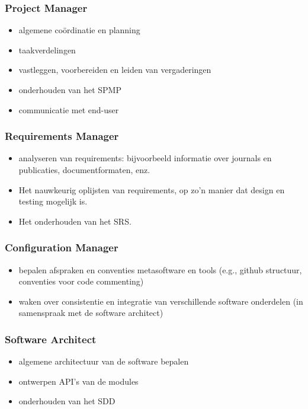 \documentclass{article}
\begin{document}
\subsubsection*{Project Manager}
\begin{itemize}
\item algemene co\"{o}rdinatie en planning
\item taakverdelingen
\item vastleggen, voorbereiden en leiden van vergaderingen
\item onderhouden van het SPMP
\item communicatie met end-user
\end{itemize}

\subsubsection*{Requirements Manager}
\begin{itemize}
\item analyseren van requirements: bijvoorbeeld informatie over journals en publicaties, documentformaten, enz. 
\item Het nauwkeurig oplijsten van requirements, op zo'n manier dat design en testing mogelijk is.
\item Het onderhouden van het SRS.
\end{itemize}

\subsubsection*{Configuration Manager}
\begin{itemize}
\item bepalen afspraken en conventies metasoftware en tools (e.g., github structuur, conventies voor code commenting) 
\item waken over consistentie en integratie van verschillende software onderdelen (in samenspraak met de software architect)
\end{itemize}

\subsubsection*{Software Architect}
\begin{itemize}
\item algemene architectuur van de software bepalen 
\item ontwerpen API's van de modules
\item onderhouden van het SDD
\end{itemize}
\end{document}
